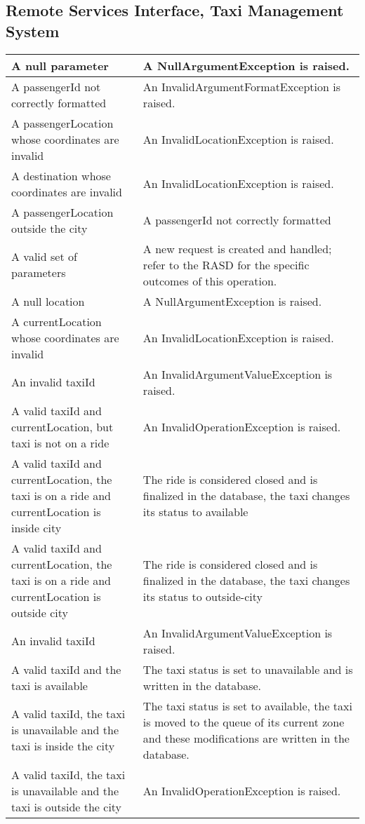 \subsection{Remote Services Interface, Taxi Management System}
\begin{tabular}{p{5cm}|p{6cm}}
	\hline
	\method{requestTaxi(passengerId, passengerLocation, destination)}
	A null parameter &
	A NullArgumentException is raised.\\\hline
	A passengerId not correctly formatted &
	An InvalidArgumentFormatException is raised. \\\hline
	A passengerLocation whose coordinates are invalid &
	An InvalidLocationException is raised. \\\hline
	A destination whose coordinates are invalid &
	An InvalidLocationException is raised. \\\hline
	A passengerLocation outside the city &
	A passengerId not correctly formatted \\\hline
	A valid set of parameters &
	A new request is created and handled; refer to the RASD for the specific outcomes of this operation. \\\hline\hline
	
	\method{endRide(taxiId, currentLocation)}
	A null location &
	A NullArgumentException is raised. \\\hline
	A currentLocation whose coordinates are invalid &
	An InvalidLocationException is raised. \\\hline
	An invalid taxiId &
	An InvalidArgumentValueException is raised. \\\hline
	A valid taxiId and currentLocation, but taxi is not on a ride &
	An InvalidOperationException is raised. \\\hline
	A valid taxiId and currentLocation, the taxi is on a ride and currentLocation is inside city&
	The ride is considered closed and is finalized in the database, the taxi changes its status to available \\\hline
	A valid taxiId and currentLocation, the taxi is on a ride and currentLocation is outside city&
	The ride is considered closed and is finalized in the database, the taxi changes its status to outside-city \\\hline\hline

	\method{togglePressed(taxiId)}
	An invalid taxiId &
	An InvalidArgumentValueException is raised. \\\hline
	A valid taxiId and the taxi is available &
	The taxi status is set to unavailable and is written in the database. \\\hline
	A valid taxiId, the taxi is unavailable and the taxi is inside the city&
	The taxi status is set to available, the taxi is moved to the queue of its current zone and these modifications are written in the database. \\\hline
	A valid taxiId, the taxi is unavailable and the taxi is outside the city&
	An InvalidOperationException is raised. \\\hline\hline	
\end{tabular}


